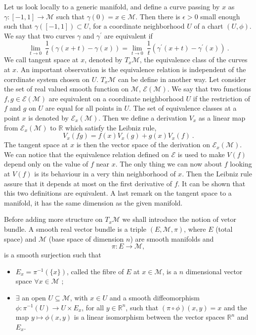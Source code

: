 \documentclass[10pt]{book}
\newcommand{\Ecal}{\mathcal{E}}
\newcommand{\Mcal}{\mathcal{M}}
\newcommand{\Rbb}{\mathbb{R}}
\theoremstyle{break}
\begin{document}
Let us look locally to a generic manifold, and define a curve passing by $x$ as $\gamma : [-1,1] \to \Mcal$ such that $\gamma(0) = x \in \Mcal$. Then there is $\epsilon > 0$ small enough such that $\gamma([-1,1]) \subset U$, for a coordinate neighborhood $U$ of a chart $(U,\phi)$. We say that two curves $\gamma$ and $\gamma^\prime$ are equivalent if
%
\begin{equation*}
\underset{t \to 0}{\lim} \ \frac{1}{t} \left( \gamma(x+t) - \gamma(x) \right) = \underset{t \to 0}{\lim} \ \frac{1}{t} \left( \gamma^\prime(x+t) - \gamma^\prime(x) \right) \ .
\end{equation*}
%
We call tangent space at $x$, denoted by $T_x\Mcal$, the equivalence class of the curves at $x$. An important observation is the equivalence relation is independent of the corrdinate system chosen on $U$. $T_x\Mcal$ can be define in another way. Let consider the set of real valued smooth function on $\Mcal$, $\Ecal(\Mcal)$. We say that two functions $f, g \in \Ecal(\Mcal)$ are equivalent on a coordinate neighborhood $U$ if the restriction of $f$ and $g$ on $U$ are equal for all points in $U$. The set of equivalence classes at a point $x$ is denoted by $\Ecal_x(\Mcal)$. Then we define a derivation $V_x$ as a linear map from $\Ecal_x(\Mcal)$ to $\Rbb$ which satisfy the Leibniz rule,
%
\begin{equation*}
V_x(fg) = f(x) V_x(g) + g(x) V_x(f) \ .
\end{equation*}
%
The tangent space at $x$ is then the vector space of the derivation on $\Ecal_x(\Mcal)$. We can notice that the equivalence relation defined on $\Ecal$ is used to make $V(f)$ depend only on the value of $f$ near $x$. The only thing we can now about $f$ looking at $V(f)$ is its behaviour in a very thin neighborhood of $x$. Then the Leibniz rule assure that it depends at most on the first derivative of $f$. It can be shown that this two definitions are equivalent.
A last remark on the tangent space to a manifold, it has the same dimension as the given manifold.




\bigskip


Before adding more structure on $T_x \Mcal$ we shall introduce the notion of vetor bundle. A smooth real vector bundle is a triple $(E,\Mcal,\pi)$, where $E$ (total space) and $\Mcal$ (base space of dimension $n$) are smooth manifolds and 
%
\begin{equation*}
\pi : E \to \Mcal , 
\end{equation*}
%
is a smooth surjection such that
%
\begin{itemize}
\item $E_x = \pi^{-1}(\{x\})$, called the fibre of $E$ at $x\in\Mcal$, is a $n$ dimensional vector space $\forall x \in \Mcal$ ; 
\item $\exists$ an open $U \subseteq \Mcal$, with $x \in U$ and a smooth diffeomorphism $\phi : \pi^{-1}(U) \to U \times E_x$, for all $y \in \Rbb^n$, such that $(\pi \circ \phi)(x,y) = x$ and the map $y \mapsto \phi(x,y)$ is a linear isomorphism between the vector spaces $\Rbb^n$ and $E_x$.
\end{itemize}
\end{document}
